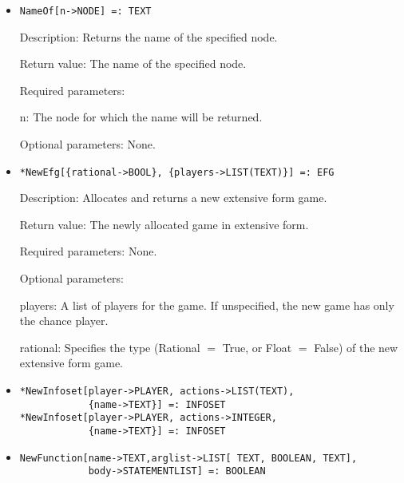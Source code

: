 \begin{itemize}
\item
\protect \large \begin{verbatim}
NameOf[n->NODE] =: TEXT
\end{verbatim}\normalsize

\bd
\item
[Description:] Returns the name of the specified node.
\item
[Return value:] The name of the specified node.
\item
[Required parameters:]\hfil\null

\bd
\item
[n:] The node for which the name will be returned.
\ed

\item
[Optional parameters:] None.
\ed

\item
\protect \large \begin{verbatim} 
*NewEfg[{rational->BOOL}, {players->LIST(TEXT)}] =: EFG
\end{verbatim}\normalsize

\bd
\item
[Description:] Allocates and returns a new extensive form game.
\item
[Return value:] The newly allocated game in extensive form.
\item
[Required parameters:] None.
\item
[Optional parameters:]\hfil\null

\bd
\item
[players:] A list of players for the game.  If
unspecified, the new game has only the chance player.
\item
[rational:] Specifies the type (Rational $=$ True, or Float $=$ False)
of the new extensive form game.
\ed
\ed

\item
\protect \large \begin{verbatim} 
*NewInfoset[player->PLAYER, actions->LIST(TEXT),
            {name->TEXT}] =: INFOSET
*NewInfoset[player->PLAYER, actions->INTEGER,
            {name->TEXT}] =: INFOSET
\end{verbatim}\normalsize


\item   
\protect \large \begin{verbatim}
NewFunction[name->TEXT,arglist->LIST[ TEXT, BOOLEAN, TEXT], 
            body->STATEMENTLIST] =: BOOLEAN
\end{verbatim}\normalsize


\end{itemize}

